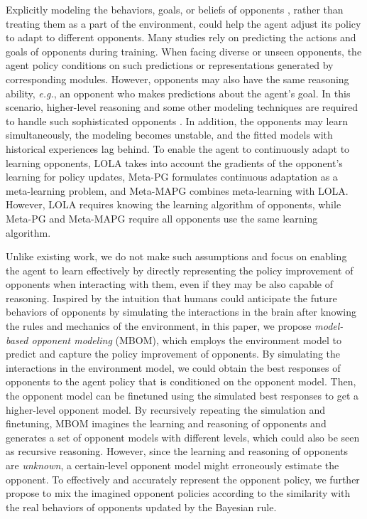 \documentclass{article}
\begin{document}
Explicitly modeling the behaviors, goals, or beliefs of opponents \citep{albrecht2018autonomous}, rather than treating them as a part of the environment, could help the agent adjust its policy to adapt to different opponents. Many studies rely on predicting the actions \citep{he2016opponent,hong2018deep,grover2018learning,papoudakis2020variational} and goals \citep{rabinowitz2018machine, raileanu2018modeling} of opponents during training. When facing diverse or unseen opponents, the agent policy conditions on such predictions or representations generated by corresponding modules. However, opponents may also have the same reasoning ability, \emph{e.g.}, an opponent who makes predictions about the agent's goal. In this scenario, higher-level reasoning and some other modeling techniques are required to handle such sophisticated opponents \citep{wen2018probabilistic,yang2019efficient,yuan2020emergence}. In addition, the opponents may learn simultaneously, the modeling becomes unstable, and the fitted models with historical experiences lag behind. To enable the agent to continuously adapt to learning opponents, LOLA \citep{foerster2018learning} takes into account the gradients of the opponent's learning for policy updates, Meta-PG \citep{shedivat2017continuous} formulates continuous adaptation as a meta-learning problem, and Meta-MAPG \citep{kim2021policy} combines meta-learning with LOLA. However, LOLA requires knowing the learning algorithm of opponents, while Meta-PG and Meta-MAPG require all opponents use the same learning algorithm.  

Unlike existing work, we do not make such assumptions and focus on enabling the agent to learn effectively by directly representing the policy improvement of opponents when interacting with them, even if they may be also capable of reasoning. Inspired by the intuition that humans could anticipate the future behaviors of opponents by simulating the interactions in the brain after knowing the rules and mechanics of the environment, in this paper, we propose \textit{model-based opponent modeling} (MBOM), which employs the environment model to predict and capture the policy improvement of opponents. By simulating the interactions in the environment model, we could obtain the best responses of opponents to the agent policy that is conditioned on the opponent model. Then, the opponent model can be finetuned using the simulated best responses to get a higher-level opponent model. 
By recursively repeating the simulation and finetuning, MBOM imagines the learning and reasoning of opponents and generates a set of opponent models with different levels, which could also be seen as recursive reasoning. However, since the learning and reasoning of opponents are \textit{unknown}, a certain-level opponent model might erroneously estimate the opponent. To effectively and accurately represent the opponent policy, we further propose to mix the imagined opponent policies according to the similarity with the real behaviors of opponents updated by the Bayesian rule.
\end{document}
